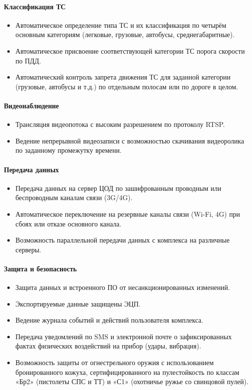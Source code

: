 \documentclass[specification,annotation,times]{itmo-student-thesis}
\begin{document}
	\paragraph{Классификация ТС}
	\begin{itemize}
		\item  Автоматическое определение типа ТС и их классификация по четырём основным категориям (легковые, грузовые, автобусы, среднегабаритные).
		\item  Автоматическое присвоение соответствующей категории ТС порога скорости по ПДД.
		\item  Автоматический контроль запрета движения ТС для заданной категории (грузовые, автобусы и т.д.) по отдельным полосам или по дороге в целом.
	\end{itemize}
	
	\paragraph{Видеонаблюдение}
	\begin{itemize}
		\item Трансляция видеопотока с высоким разрешением по протоколу RTSP.
		\item Ведение непрерывной видеозаписи с возможностью скачивания видеоролика по заданному промежутку времени.
	\end{itemize}
	
	\paragraph{Передача данных}
	\begin{itemize}
		\item Передача данных на сервер ЦОД по зашифрованным проводным или беспроводным каналам связи (3G/4G).
		\item Автоматическое переключение на резервные каналы связи (Wi-Fi, 4G) при сбоях или отказе основного канала.
		\item Возможность параллельной передачи данных с комплекса на различные серверы.
	\end{itemize}
	
	\paragraph{Защита и безопасность}
	\begin{itemize}
		\item Защита данных и встроенного ПО от несанкционированных изменений.
		\item Экспортируемые данные защищены ЭЦП.
		\item Ведение журнала событий и действий пользователя комплекса.
		\item Передача уведомлений по SMS и электронной почте о зафиксированных фактах физических воздействий на прибор (удары, вибрация).
		\item Возможность защиты от огнестрельного оружия с использованием бронированного кожуха, сертифицированного на пулестойкость по классам «Бр2» (пистолеты СПС и ТТ) и «С1» (охотничье ружье со свинцовой пулей).
	\end{itemize}
	
\end{document}
